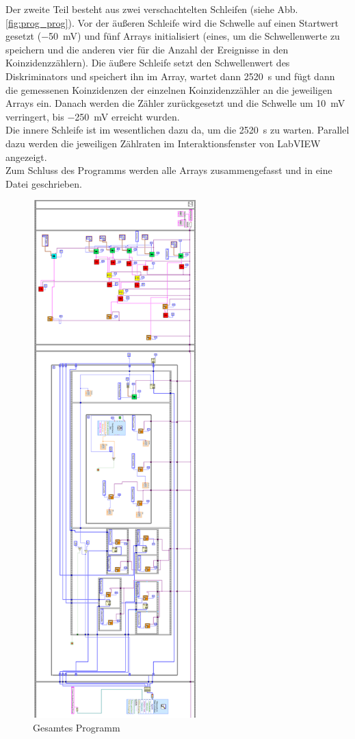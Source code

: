 Der zweite Teil besteht aus zwei verschachtelten Schleifen (siehe Abb. \ref{fig:prog_prog}). Vor der äußeren Schleife wird die Schwelle auf einen Startwert gesetzt (\SI{-50}{\milli\volt}) und fünf Arrays initialisiert (eines, um die Schwellenwerte zu speichern und die anderen vier für die Anzahl der Ereignisse in den Koinzidenzzählern). Die äußere Schleife setzt den Schwellenwert des Diskriminators und speichert ihn im Array, wartet dann \SI{2520}{\second} und fügt dann die gemessenen Koinzidenzen der einzelnen Koinzidenzzähler an die jeweiligen Arrays ein. Danach werden die Zähler zurückgesetzt und die Schwelle um \SI{10}{\milli\volt} verringert, bis \SI{-250}{\milli\volt} erreicht wurden.\\
Die innere Schleife ist im wesentlichen dazu da, um die \SI{2520}{\second} zu warten. Parallel dazu werden die jeweiligen Zählraten im Interaktionsfenster von LabVIEW angezeigt.\\
Zum Schluss des Programms werden alle Arrays zusammengefasst und in eine Datei geschrieben.

\begin{figure}[h]
\centering
\includegraphics[height=20cm]{data/friedrich/prog_ges_rot.png}
\caption{Gesamtes Programm}
\label{fig:prog_all}
\end{figure}

